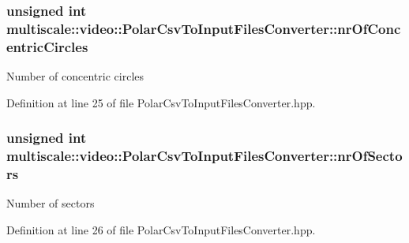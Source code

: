 \hypertarget{classmultiscale_1_1video_1_1PolarCsvToInputFilesConverter_a7aa37d18880e822369cbe118a093e24f}{
\subsubsection[{nr\-Of\-Concentric\-Circles}]{\setlength{\rightskip}{0pt plus 5cm}unsigned int {\bf multiscale\-::video\-::\-Polar\-Csv\-To\-Input\-Files\-Converter\-::nr\-Of\-Concentric\-Circles}}}\label{classmultiscale_1_1video_1_1PolarCsvToInputFilesConverter_a7aa37d18880e822369cbe118a093e24f}
\-Number of concentric circles 

\-Definition at line 25 of file \-Polar\-Csv\-To\-Input\-Files\-Converter.\-hpp.

\hypertarget{classmultiscale_1_1video_1_1PolarCsvToInputFilesConverter_a9246a2c9749602af145d5579bde8a9d1}{
\subsubsection[{nr\-Of\-Sectors}]{\setlength{\rightskip}{0pt plus 5cm}unsigned int {\bf multiscale\-::video\-::\-Polar\-Csv\-To\-Input\-Files\-Converter\-::nr\-Of\-Sectors}}}\label{classmultiscale_1_1video_1_1PolarCsvToInputFilesConverter_a9246a2c9749602af145d5579bde8a9d1}
\-Number of sectors 

\-Definition at line 26 of file \-Polar\-Csv\-To\-Input\-Files\-Converter.\-hpp.

